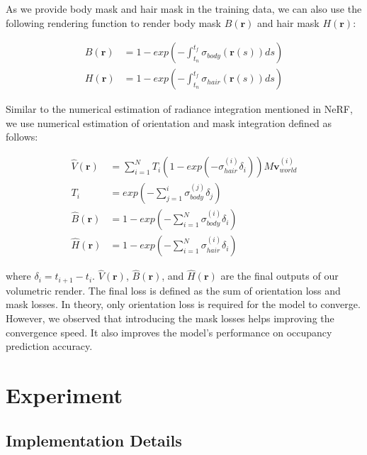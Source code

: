 \documentclass{article}
\begin{document}
As we provide body mask and hair mask in the training data, we can also use the following rendering function to render body mask $B(\mathbf{r})$ and hair mask $H(\mathbf{r})$:

\begin{align}
	B(\mathbf{r}) & = 1 - exp(-\int_{t_{n}}^{t_{f}} \sigma_{body}(\mathbf{r}(s)) ds) \\
	H(\mathbf{r}) & = 1 - exp(-\int_{t_{n}}^{t_{f}} \sigma_{hair}(\mathbf{r}(s)) ds)
\end{align}

Similar to the numerical estimation of radiance integration mentioned in NeRF, we use numerical estimation of orientation and mask integration defined as follows:

\begin{align}
	\hat{V}(\mathbf{r}) & = \sum_{i=1}^{N} T_{i} (1 - exp(-\sigma_{hair}^{(i)} \delta_{i})) M \mathbf{v}_{world}^{(i)} \\
	T_{i} & = exp(-\sum_{j=1}^{i} \sigma_{body}^{(j)} \delta_{j}) \\
	\hat{B}(\mathbf{r}) & = 1 - exp(-\sum_{i=1}^{N} \sigma_{body}^{(i)} \delta_{i}) \\
	\hat{H}(\mathbf{r}) & = 1 - exp(-\sum_{i=1}^{N} \sigma_{hair}^{(i)} \delta_{i})
\end{align}

where $\delta_{i} = t_{i + 1} - t_{i}$. $\hat{V}(\mathbf{r})$, $\hat{B}(\mathbf{r})$, and $\hat{H}(\mathbf{r})$ are the final outputs of our volumetric render. The final loss is defined as the sum of orientation loss and mask losses. In theory, only orientation loss is required for the model to converge. However, we observed that introducing the mask losses helps improving the convergence speed. It also improves the model's performance on occupancy prediction accuracy.

\section{Experiment}


\subsection{Implementation Details}
\end{document}
